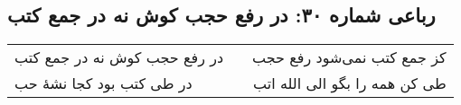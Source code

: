 \begin{center}
\section*{رباعی شماره ۳۰: در رفع حجب کوش نه در جمع کتب}
\label{sec:sh030}
\begin{longtable}{l p{0.5cm} r}
در رفع حجب کوش نه در جمع کتب
&&
کز جمع کتب نمی‌شود رفع حجب
\\
در طی کتب بود کجا نشهٔ حب
&&
طی کن همه را بگو الی الله اتب
\\
\end{longtable}
\end{center}
